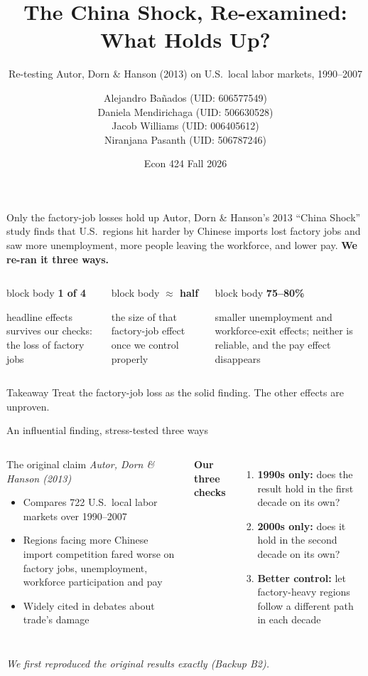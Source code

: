 \documentclass[11pt]{beamer}
\title{The China Shock, Re-examined:\\ What Holds Up?}
\subtitle{Re-testing Autor, Dorn \& Hanson (2013) on U.S.\ local labor markets, 1990--2007}
\author{Alejandro Ba\~{n}ados (UID: 606577549)\\
        Daniela Mendirichaga (UID: 506630528)\\
        Jacob Williams (UID: 006405612)\\
        Niranjana Pasanth (UID: 506787246)}
\date{Econ 424 \textperiodcentered{} Fall 2026}
\newcommand{\smallnote}[1]{{\scriptsize\color{muted}\textit{#1}}}
\newcommand{\stat}[2]{%
  \begin{beamercolorbox}[wd=\linewidth, sep=0.6em, rounded=true]{block body}
    {\Large\bfseries\color{uclablue}#1}\par\smallskip
    {\footnotesize #2}
  \end{beamercolorbox}}
\begin{document}
{
\begin{frame}[plain]
  \titlepage
\end{frame}
}

\begin{frame}{Only the factory-job losses hold up}
  \small Autor, Dorn \& Hanson's 2013 ``China Shock'' study finds that U.S.\ regions hit harder by Chinese imports lost factory jobs and saw
  more unemployment, more people leaving the workforce, and lower pay. \textbf{We re-ran it three ways.}

  \bigskip
  \begin{columns}[T]
    \stat{1 of 4}{headline effects survives our checks: the loss of factory jobs}
    \stat{$\approx$ half}{the size of that factory-job effect once we control properly}
    \stat{75--80\%}{smaller unemployment and workforce-exit effects; neither is reliable, and the pay effect disappears}
  \end{columns}

  \bigskip
  \begin{alertblock}{Takeaway}
    Treat the factory-job loss as the solid finding. The other effects are unproven.
  \end{alertblock}
\end{frame}

\begin{frame}{An influential finding, stress-tested three ways}
  \begin{columns}[T]
    \begin{block}{The original claim}
      \footnotesize\textit{Autor, Dorn \& Hanson (2013)}
      \begin{itemize}\footnotesize
        \item Compares 722 U.S.\ local labor markets over 1990--2007
        \item Regions facing more Chinese import competition fared worse on factory jobs,
              unemployment, workforce participation and pay
        \item Widely cited in debates about trade's damage
      \end{itemize}
    \end{block}
    \textbf{Our three checks}
    \begin{enumerate}\small
      \item \textbf{1990s only:} does the result hold in the first decade on its own?
      \item \textbf{2000s only:} does it hold in the second decade on its own?
      \item \textbf{Better control:} let factory-heavy regions follow a different path in each decade
    \end{enumerate}
  \end{columns}
  \vfill
  \smallnote{We first reproduced the original results exactly (Backup B2).}
\end{frame}
\end{document}
